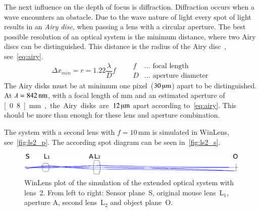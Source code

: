 \documentclass[12pt,a4paper]{article}
\begin{document}
The next influence on the depth of focus is diffraction.
Diffraction occurs when a wave encounters an obstacle.
Due to the wave nature of light every spot of light results in an \emph{Airy disc}, when passing a lens with a circular aperture.
The best possible resolution of an optical system is the minimum distance, where two Airy discs can be distinguished.
This distance is the radius of the Airy disc~\cite{jaeger}, see~\autoref{eq:airy}. %
\begin{equation}
\label{eq:airy}
\Delta x_{min} = r = 1.22 \frac{\lambda}{D} f \qquad
\begin{aligned}
f & \dots \text{ focal length}\\
D & \dots \text{ aperture diameter}
\end{aligned}
\end{equation}
The Airy disks must be at minimum one pixel~($\unit[30]{\muup m}$) apart to be distinguished.
At $\lambda = \unit[842]{nm}$, with a focal length of \unit[10]{mm} and an estimated aperture of \unit[0.8]{mm}, the Airy disks are~$\unit[12]{\muup m}$ apart according to~\autoref{eq:airy}.
This should be more than enough for these lens and aperture combination.

The system with a second lens with $f=10$\,mm is simulated in WinLens, see~\autoref{fig:ls2_p}.
The according spot diagram can be seen in~\autoref{fig:ls2_s}.

\begin{figure}[htbp] %
\begin{center}
\includegraphics[width=1\columnwidth]{figures/lens_system_l2}
\caption{\label{fig:ls2_p}
WinLens plot of the simulation of the extended optical system with lens~2.
From left to right:
Sensor plane~S,
original mouse lens~L$_1$,
aperture A,
second lens~L$_2$ and
object plane~O.
}
\end{center}
\end{figure}
\end{document}

